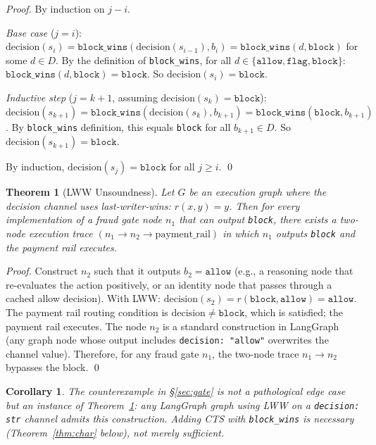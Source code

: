 \documentclass{article}
\newtheorem{theorem}{Theorem}
\newtheorem{corollary}{Corollary}
\begin{document}
\begin{proof}
By induction on $j - i$.

\textit{Base case} ($j = i$): $\mathrm{decision}(s_i) = \texttt{block\_wins}(\mathrm{decision}(s_{i-1}), b_i) = \texttt{block\_wins}(d, \texttt{block})$ for some $d \in D$. By the definition of \texttt{block\_wins}, for all $d \in \{\texttt{allow}, \texttt{flag}, \texttt{block}\}$: $\texttt{block\_wins}(d, \texttt{block}) = \texttt{block}$. So $\mathrm{decision}(s_i) = \texttt{block}$.

\textit{Inductive step} ($j = k{+}1$, assuming $\mathrm{decision}(s_k) = \texttt{block}$): $\mathrm{decision}(s_{k+1}) = \texttt{block\_wins}(\mathrm{decision}(s_k), b_{k+1}) = \texttt{block\_wins}(\texttt{block}, b_{k+1})$. By \texttt{block\_wins} definition, this equals \texttt{block} for all $b_{k+1} \in D$. So $\mathrm{decision}(s_{k+1}) = \texttt{block}$.

By induction, $\mathrm{decision}(s_j) = \texttt{block}$ for all $j \geq i$. \qed
\end{proof}

\begin{theorem}[LWW Unsoundness]
\label{thm:lww_unsound}
Let $G$ be an execution graph where the decision channel uses last-writer-wins: $r(x, y) = y$. Then for every implementation of a fraud gate node $n_1$ that can output \textup{\texttt{block}}, there exists a two-node execution trace $(n_1 \to n_2 \to \mathrm{payment\_rail})$ in which $n_1$ outputs \textup{\texttt{block}} and the payment rail executes.
\end{theorem}

\begin{proof}
Construct $n_2$ such that it outputs $b_2 = \texttt{allow}$ (e.g., a reasoning node that re-evaluates the action positively, or an identity node that passes through a cached allow decision). With LWW: $\mathrm{decision}(s_2) = r(\texttt{block}, \texttt{allow}) = \texttt{allow}$. The payment rail routing condition is $\mathrm{decision} \neq \texttt{block}$, which is satisfied; the payment rail executes. The node $n_2$ is a standard construction in LangGraph (any graph node whose output includes \texttt{decision: "allow"} overwrites the channel value). Therefore, for any fraud gate $n_1$, the two-node trace $n_1 \to n_2$ bypasses the block. \qed
\end{proof}

\begin{corollary}
The counterexample in \S\ref{sec:gate} is not a pathological edge case but an instance of Theorem~\ref{thm:lww_unsound}: any LangGraph graph using LWW on a \texttt{decision: str} channel admits this construction. Adding CTS with \texttt{block\_wins} is necessary (Theorem~\ref{thm:char} below), not merely sufficient.
\end{corollary}
\end{document}
